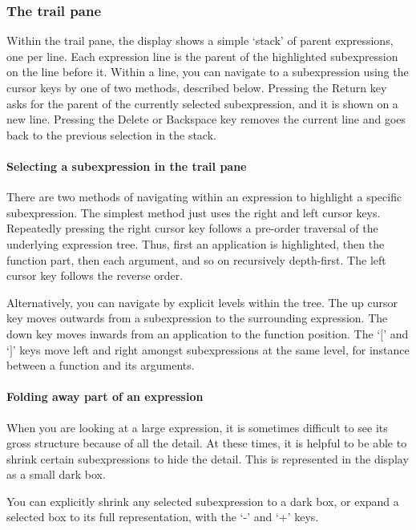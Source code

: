 \documentclass[12pt]{article}
\begin{document}
\subsubsection{The trail pane}

Within the trail pane, the display shows a simple `stack' of parent
expressions, one per line.  Each expression line is the parent of
the highlighted subexpression on the line before it.  Within a line,
you can navigate to a subexpression using the cursor keys by one of
two methods, described below.  Pressing the Return key asks for the
parent of the currently selected subexpression, and it is shown on a
new line.  Pressing the Delete or Backspace key removes the current
line and goes back to the previous selection in the stack.

\paragraph{Selecting a subexpression in the trail pane}

There are two methods of navigating within an expression to highlight
a specific subexpression.  The simplest method just uses the right and
left cursor keys.  Repeatedly pressing the right cursor key follows
a pre-order traversal of the underlying expression tree.  Thus,
first an application is highlighted, then the function part, then
each argument, and so on recursively depth-first.  The left cursor
key follows the reverse order.

Alternatively, you can navigate by explicit levels within the
tree.  The up cursor key moves outwards from a subexpression to the
surrounding expression.  The down key moves inwards from an application
to the function position.  The `$[$' and `$]$' keys move left and right
amongst subexpressions at the same level, for instance between a
function and its arguments.


\paragraph{Folding away part of an expression}

When you are looking at a large expression, it is sometimes difficult
to see its gross structure because of all the detail.  At these times,
it is helpful to be able to shrink certain subexpressions to hide the
detail.  This is represented in the display as a small dark box.

You can explicitly shrink any selected subexpression to a dark box,
or expand a selected box to its full representation, with the `-'
and `+' keys.
\end{document}
